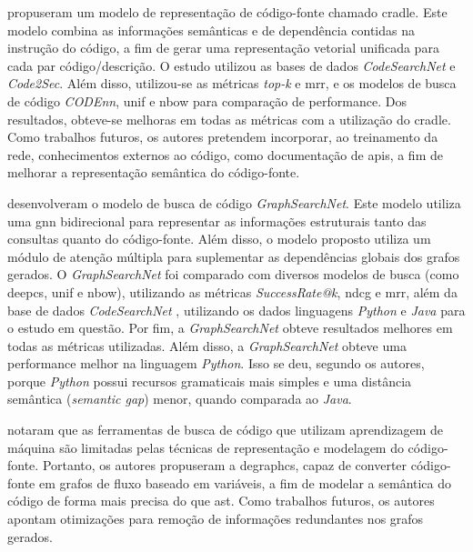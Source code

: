 \textcite{Gu2021CRaDLeDC} propuseram um modelo de representação de código-fonte chamado \gls{cradle}. Este modelo combina as informações semânticas e de dependência contidas na instrução do código, a fim de gerar uma representação vetorial unificada para cada par código/descrição. O estudo utilizou as bases de dados \textit{CodeSearchNet} \cite{Husain2019CodeSearchNetCE} e \textit{Code2Sec}. Além disso, utilizou-se as métricas \textit{top-k} e \gls{mrr}, e os modelos de busca de código \textit{CODEnn}, \gls{unif} e \gls{nbow} para comparação de performance. Dos resultados, obteve-se melhoras em todas as métricas com a utilização do \gls{cradle}. Como trabalhos futuros, os autores pretendem incorporar, ao treinamento da rede, conhecimentos externos ao código, como documentação de \glspl{api}, a fim de melhorar a representação semântica do código-fonte.

\textcite{Liu2021GraphSearchNetEG} desenvolveram o modelo de busca de código \textit{GraphSearchNet}. Este modelo utiliza uma \gls{gnn} bidirecional para representar as informações estruturais tanto das consultas quanto do código-fonte. Além disso, o modelo proposto utiliza um módulo de atenção múltipla para suplementar as dependências globais dos grafos gerados. O \textit{GraphSearchNet} foi comparado com diversos modelos de busca (como \gls{deepcs}, \gls{unif} e \gls{nbow}), utilizando as métricas \textit{SuccessRate@k}, \gls{ndcg} e \gls{mrr}, além da base de dados \textit{CodeSearchNet} \cite{Husain2019CodeSearchNetCE}, utilizando os dados linguagens \textit{Python} e \textit{Java} para o estudo em questão. Por fim, a \textit{GraphSearchNet} obteve resultados melhores em todas as métricas utilizadas. Além disso, a \textit{GraphSearchNet} obteve uma performance melhor na linguagem \textit{Python}. Isso se deu, segundo os autores, porque \textit{Python} possui recursos gramaticais mais simples e uma distância semântica (\textit{semantic gap}) menor, quando comparada ao \textit{Java}.

\textcite{Zeng2021deGraphCSEV} notaram que as ferramentas de busca de código que utilizam aprendizagem de máquina são limitadas pelas técnicas de representação e modelagem do código-fonte. Portanto, os autores propuseram a \gls{degraphcs}, capaz de converter código-fonte em grafos de fluxo baseado em variáveis, a fim de modelar a semântica do código de forma mais precisa do que \gls{ast}. Como trabalhos futuros, os autores apontam otimizações para remoção de informações redundantes nos grafos gerados.

